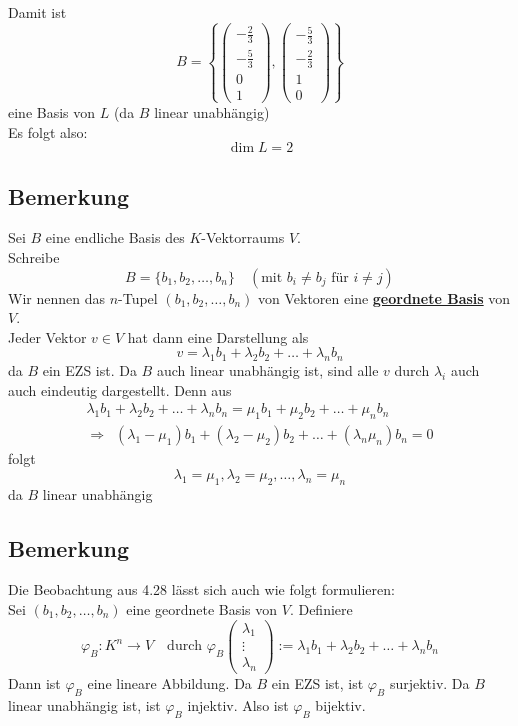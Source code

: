 Damit ist 
\[
	B = \left\{ 
	\begin{pmatrix}
		- \frac{2}{3} \\ - \frac{5}{3} \\ 0 \\ 1
	\end{pmatrix}
	,
	\begin{pmatrix}
		- \frac{5}{3} \\ - \frac{2}{3} \\ 1 \\ 0
	\end{pmatrix}
	\right\}
\]
eine Basis von $L$ (da $B$ linear unabhängig) \\
Es folgt also:
\[
	\dim L = 2
\]

\subsection{Bemerkung} %
\label{sub:bemerkung}
Sei $B$ eine endliche Basis des \(K\)-Vektorraums $V$. \\
Schreibe 
\[
	B= \{ b_1, b_2, \ldots , b_n\} \quad (\text{mit } b_i \not= b_j \text{ für } i \not= j)
\]
Wir nennen das $n$-Tupel $(b_1, b_2, \ldots , b_n)$ von Vektoren eine \underline{\textbf{geordnete Basis}} von $V$. \\
Jeder Vektor $v \in V$ hat dann eine Darstellung als 
\[
	v= \lambda_1 b_1 + \lambda_2 b_2 + \ldots + \lambda_n b_n
\]
da $B$ ein EZS ist. Da $B$ auch linear unabhängig ist, sind alle $v$ durch $\lambda_i$ auch auch eindeutig dargestellt.
Denn aus
\begin{gather*}
	\lambda_1 b_1 + \lambda_2 b_2 + \ldots + \lambda_n b_n = \mu_1 b_1 + \mu_2 b_2 + \ldots + \mu_n b_n \\
	\Rightarrow \enspace (\lambda_1 - \mu_1)b_1 + (\lambda_2 - \mu_2)b_2 + \ldots + (\lambda_n \mu_n)b_n = 0
\end{gather*}
folgt
\[
	\lambda_1 = \mu_1 , \lambda_2 =\mu_2 , \ldots , \lambda_n = \mu_n
\]
da $B$ linear unabhängig

\subsection{Bemerkung} %
\label{sub:bemerkung}
Die Beobachtung aus 4.28 lässt sich auch wie folgt formulieren:
\vspace{\baselineskip} \\
Sei $(b_1 , b_2, \ldots , b_n)$ eine geordnete Basis von $V$.
Definiere
\[
	\varphi_B : K^n \to V \quad \text{durch } \varphi_B 
	\begin{pmatrix}
		\lambda_1 \\ \vdots \\ \lambda_n
	\end{pmatrix}
	:= \lambda_1 b_1 + \lambda_2 b_2 + \ldots + \lambda_n b_n
\]
Dann ist $\varphi_B$ eine lineare Abbildung. Da $B$ ein EZS ist, ist $\varphi_B$ surjektiv. Da $B$ linear unabhängig ist, ist $\varphi_B$
injektiv. Also ist $\varphi_B$ bijektiv.

